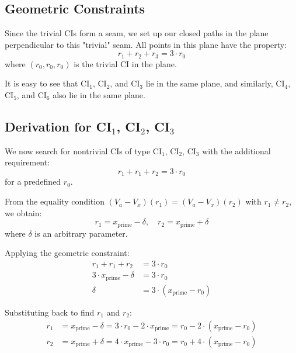 \documentclass{article}
\begin{document}
\subsection{Geometric Constraints}

Since the trivial CIs form a seam, we set up our closed paths in the plane perpendicular to this "trivial" seam. All points in this plane have the property:
\begin{equation}
r_1 + r_2 + r_3 = 3 \cdot r_0
\end{equation}
where $(r_0, r_0, r_0)$ is the trivial CI in the plane.

It is easy to see that $\text{CI}_1$, $\text{CI}_2$, and $\text{CI}_3$ lie in the same plane, and similarly, $\text{CI}_4$, $\text{CI}_5$, and $\text{CI}_6$ also lie in the same plane.

\subsection{Derivation for CI$_1$, CI$_2$, CI$_3$}

We now search for nontrivial CIs of type $\text{CI}_1$, $\text{CI}_2$, $\text{CI}_3$ with the additional requirement:
\begin{equation}
r_1 + r_1 + r_2 = 3 \cdot r_0
\end{equation}
for a predefined $r_0$.

From the equality condition $(V_a - V_x)(r_1) = (V_a - V_x)(r_2)$ with $r_1 \neq r_2$, we obtain:
\begin{equation}
r_1 = x_{\text{prime}} - \delta, \quad r_2 = x_{\text{prime}} + \delta
\end{equation}
where $\delta$ is an arbitrary parameter.

Applying the geometric constraint:
\begin{align}
r_1 + r_1 + r_2 &= 3 \cdot r_0 \\
3 \cdot x_{\text{prime}} - \delta &= 3 \cdot r_0 \\
\delta &= 3 \cdot (x_{\text{prime}} - r_0)
\end{align}

Substituting back to find $r_1$ and $r_2$:
\begin{align}
r_1 &= x_{\text{prime}} - \delta = 3 \cdot r_0 - 2 \cdot x_{\text{prime}} = r_0 - 2 \cdot (x_{\text{prime}} - r_0) \\
r_2 &= x_{\text{prime}} + \delta = 4 \cdot x_{\text{prime}} - 3 \cdot r_0 = r_0 + 4 \cdot (x_{\text{prime}} - r_0)
\end{align}
\end{document}
